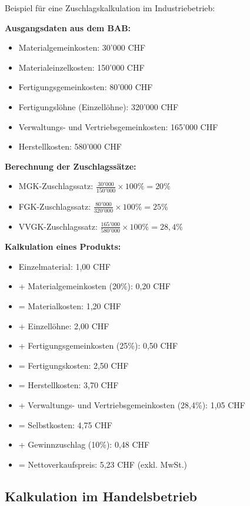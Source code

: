 \begin{example}
Beispiel für eine Zuschlagskalkulation im Industriebetrieb:

\textbf{Ausgangsdaten aus dem BAB:}
\begin{itemize}
    \item Materialgemeinkosten: 30'000 CHF
    \item Materialeinzelkosten: 150'000 CHF
    \item Fertigungsgemeinkosten: 80'000 CHF
    \item Fertigungslöhne (Einzellöhne): 320'000 CHF
    \item Verwaltungs- und Vertriebsgemeinkosten: 165'000 CHF
    \item Herstellkosten: 580'000 CHF
\end{itemize}

\textbf{Berechnung der Zuschlagssätze:}
\begin{itemize}
    \item MGK-Zuschlagssatz: $\frac{30'000}{150'000} \times 100\% = 20\%$
    \item FGK-Zuschlagssatz: $\frac{80'000}{320'000} \times 100\% = 25\%$
    \item VVGK-Zuschlagssatz: $\frac{165'000}{580'000} \times 100\% = 28,4\%$
\end{itemize}

\textbf{Kalkulation eines Produkts:}
\begin{itemize}
    \item Einzelmaterial: 1,00 CHF
    \item + Materialgemeinkosten (20\%): 0,20 CHF
    \item = Materialkosten: 1,20 CHF
    \item + Einzellöhne: 2,00 CHF
    \item + Fertigungsgemeinkosten (25\%): 0,50 CHF
    \item = Fertigungskosten: 2,50 CHF
    \item = Herstellkosten: 3,70 CHF
    \item + Verwaltungs- und Vertriebsgemeinkosten (28,4\%): 1,05 CHF
    \item = Selbstkosten: 4,75 CHF
    \item + Gewinnzuschlag (10\%): 0,48 CHF
    \item = Nettoverkaufspreis: 5,23 CHF (exkl. MwSt.)
\end{itemize}
\end{example}

\subsection{Kalkulation im Handelsbetrieb}

